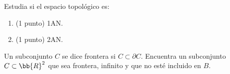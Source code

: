 \documentclass[12pt]{article}
\begin{document}
    \begin{ejercicio}
        Estudia si el espacio topológico es:
        \begin{enumerate}
            \item (1 punto) 1AN.
            \item (1 punto) 2AN.
        \end{enumerate}
    \end{ejercicio}

    \begin{ejercicio}[1.5 puntos]
        Un subconjunto $C$ se dice frontera si $C\subset \partial C$. Encuentra un subconjunto $C\subset \bb{R}^2$ que sea frontera, infinito y que no esté incluido en $B$.
    \end{ejercicio}
\end{document}
